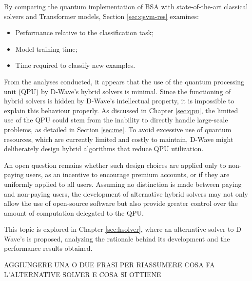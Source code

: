 By comparing the quantum implementation of BSA with state-of-the-art classical solvers and Transformer models, Section \ref{sec:qsvm-res} examines:
\begin{itemize}
    \item Performance relative to the classification task;
    \item Model training time;
    \item Time required to classify new examples.
\end{itemize}

From the analyses conducted, it appears that the use of the quantum processing unit (QPU) by D-Wave’s hybrid solvers is minimal.
Since the functioning of hybrid solvers is hidden by D-Wave’s intellectual property, it is impossible to explain this behaviour properly.
As discussed in Chapter \ref{sec:qpu}, the limited use of the QPU could stem from the inability to directly handle large-scale problems, as detailed in Section \ref{sec:me}.
To avoid excessive use of quantum resources, which are currently limited and costly to maintain, D-Wave might deliberately design hybrid algorithms that reduce QPU utilization.

An open question remains whether such design choices are applied only to non-paying users, as an incentive to encourage premium accounts, or if they are uniformly applied to all users.
Assuming no distinction is made between paying and non-paying users, the development of alternative hybrid solvers may not only allow the use of open-source software but also provide greater control over the amount of computation delegated to the QPU.

This topic is explored in Chapter \ref{sec:hsolver}, where an alternative solver to D-Wave's is proposed, analyzing the rationale behind its development and the performance results obtained.

AGGIUNGERE UNA O DUE FRASI PER RIASSUMERE COSA FA L'ALTERNATIVE SOLVER E COSA SI OTTIENE